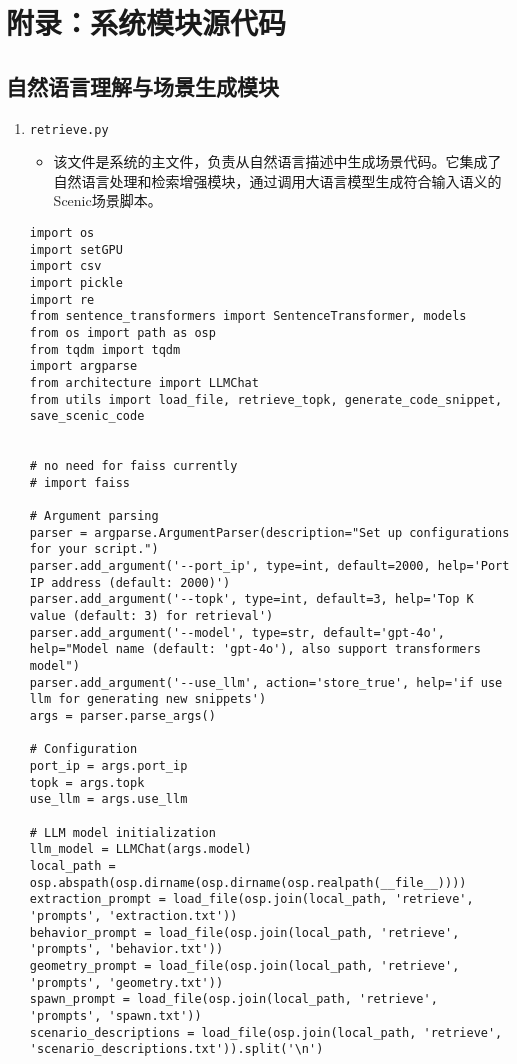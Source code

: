 \section*{附录：系统模块源代码}

\subsection*{自然语言理解与场景生成模块}
\begin{enumerate}
	\item \texttt{retrieve.py}
	\begin{itemize}
		\item 该文件是系统的主文件，负责从自然语言描述中生成场景代码。它集成了自然语言处理和检索增强模块，通过调用大语言模型生成符合输入语义的Scenic场景脚本。
	\end{itemize}
	\begin{verbatim}
import os
import setGPU
import csv
import pickle
import re
from sentence_transformers import SentenceTransformer, models
from os import path as osp
from tqdm import tqdm
import argparse
from architecture import LLMChat
from utils import load_file, retrieve_topk, generate_code_snippet, save_scenic_code


# no need for faiss currently
# import faiss

# Argument parsing
parser = argparse.ArgumentParser(description="Set up configurations for your script.")
parser.add_argument('--port_ip', type=int, default=2000, help='Port IP address (default: 2000)')
parser.add_argument('--topk', type=int, default=3, help='Top K value (default: 3) for retrieval')
parser.add_argument('--model', type=str, default='gpt-4o', help="Model name (default: 'gpt-4o'), also support transformers model")
parser.add_argument('--use_llm', action='store_true', help='if use llm for generating new snippets')
args = parser.parse_args()

# Configuration
port_ip = args.port_ip
topk = args.topk
use_llm = args.use_llm

# LLM model initialization
llm_model = LLMChat(args.model)
local_path = osp.abspath(osp.dirname(osp.dirname(osp.realpath(__file__))))
extraction_prompt = load_file(osp.join(local_path, 'retrieve', 'prompts', 'extraction.txt'))
behavior_prompt = load_file(osp.join(local_path, 'retrieve', 'prompts', 'behavior.txt'))
geometry_prompt = load_file(osp.join(local_path, 'retrieve', 'prompts', 'geometry.txt'))
spawn_prompt = load_file(osp.join(local_path, 'retrieve', 'prompts', 'spawn.txt'))
scenario_descriptions = load_file(osp.join(local_path, 'retrieve', 'scenario_descriptions.txt')).split('\n')


\end{verbatim}
\end{enumerate}
